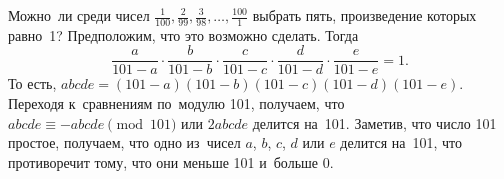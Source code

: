 \problem{}
Можно~ли среди чисел
$\frac{1}{100}, \frac{2}{99}, \frac{3}{98}, \ldots, \frac{100}{1}$
выбрать пять, произведение которых равно~1?
\solution
Предположим, что это возможно сделать.
Тогда
\[
    \frac{a}{101 - a} \cdot \frac{b}{101 - b} \cdot
    \frac{c}{101 - c} \cdot \frac{d}{101 - d} \cdot
    \frac{e}{101 - e}
=
    1
.\]
То есть, $a b c d e = (101 - a) (101 - b) (101 - c) (101 - d) (101 - e)$.
Переходя к~сравнениям по~модулю 101, получаем, что
$a b c d e \equiv - a b c d e  \pmod{101}$ или $2 a b c d e $ делится на~101.
Заметив, что число 101 простое, получаем, что одно из~чисел
$a$, $b$, $c$, $d$ или $e$ делится на~101, что противоречит тому, что они
меньше 101 и~больше 0.
\endproblem
